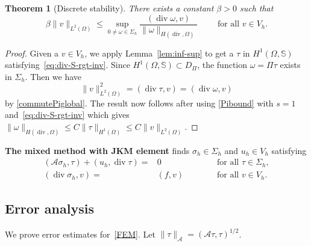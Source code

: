 \documentclass[12pt]{amsart}
\numberwithin{equation}{section}
\DeclareMathOperator{\divg}{div}
\newtheorem{theorem}{Theorem}[section]
\theoremstyle{definition}
\theoremstyle{remark}
\newcommand{\om}{{\Omega}}
\renewcommand{\(}{\bigl(}
\renewcommand{\)}{\bigr)}
\newcommand{\Aa}{\mathcal{A}}
\begin{document}
\begin{theorem}[Discrete stability]\label{thm:inf-sup-JM}
There exists a constant $\beta>0$ such that 
\begin{equation}
   \beta \| v \|_{L^2(\om)} \le \sup_{0 \neq \omega \in \Sigma_h}  \frac{( \divg \omega, v)}{\|\omega\|_{H(\divg,\Omega)} } \qquad {\text{ for all }} v \in V_h. 
\end{equation}
\end{theorem}
\begin{proof}
  Given a $v\in V_h$, we apply Lemma~\ref{lem:inf-sup} to get  a $\tau$ in
  $H^1(\om, \mathbb S)$ satisfying~\eqref{eq:div-S-rgt-inv}.  Since
  $H^1(\om, \mathbb S) \subset D_\Pi$, the function 
  $\omega= \Pi \tau$ exists in $\Sigma_h.$ Then we have
\begin{equation}
\|v\|_{L^2(\Omega)}^2= (\divg \tau, v)= (\divg \omega, v) 
\end{equation}
by \eqref{commutePiglobal}. The result now follows after using \eqref{Pibound} with $s=1$ 
 and~\eqref{eq:div-S-rgt-inv} which gives $\|\omega\|_{H(\divg, \Omega)} \le C \|\tau\|_{H^1(\Omega)} \le C \| v\|_{L^2(\Omega)}$. 
\end{proof}


{\bf The mixed method with JKM element} finds 
$\sigma_h \in \Sigma_h$ and $u_h \in V_h$ satisfying
\begin{subequations}\label{FEM}
\begin{alignat}{2}
(\Aa \sigma_h, \tau)+(u_h, \divg \tau)=& 0 \qquad && {\text{ for all }} \tau \in \Sigma_h, \label{FEM1}\\
(\divg \sigma_h, v)=& (f,v) \qquad  && {\text{ for all }} v \in V_h. \label{FEM2}
\end{alignat}
\end{subequations}


\subsection{Error analysis}

We prove error estimates for~\eqref{FEM}.
Let $\| \tau \|_{\Aa} = (\Aa \tau, \tau)^{1/2}$.
\end{document}
